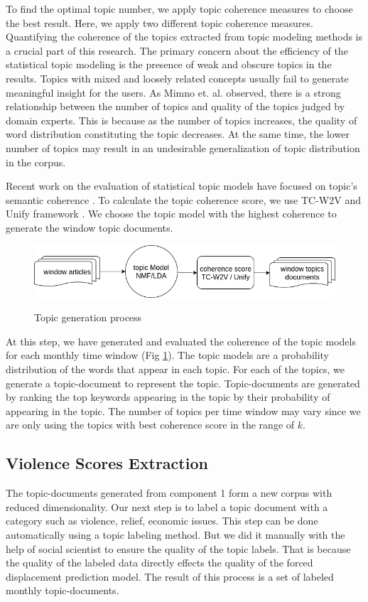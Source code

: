 To find the optimal topic number, we apply topic coherence measures to choose the best result. Here, we apply two different topic coherence measures. Quantifying the coherence of the topics extracted from topic modeling methods is a crucial part of this research. The primary concern about the efficiency of the statistical topic modeling is the presence of weak and obscure topics in the results. Topics with mixed and loosely related concepts usually fail to generate meaningful insight for the users. As Mimno et. al. \cite{Mimno} observed, there is a strong relationship between the number of topics and quality of the topics judged by domain experts. This is because as the number of topics increases, the quality of word distribution constituting the topic decreases. At the same time, the lower number of topics may result in an undesirable generalization of topic distribution in the corpus.  

Recent work on the evaluation of statistical topic models have focused on topic's semantic coherence \cite{Ocallaghan,Roder2015}. To calculate the topic coherence score, we use TC-W2V \cite{Ocallaghan} and Unify framework \cite{Roder2015}. We choose the topic model with the highest coherence to generate the window topic documents. 

\begin{figure}[!ht]
\centering
\caption{Topic generation process}
\includegraphics[scale=.4]{img/topic_generation}
\label{fig:topicgeneration}
\end{figure}

At this step, we have generated and evaluated the coherence of the topic models for each monthly time window (Fig \ref{fig:topicgeneration}). The topic models are a probability distribution of the words that appear in each topic. For each of the topics, we generate a topic-document to represent the topic. Topic-documents are generated by ranking the top keywords appearing in the topic by their probability of appearing in the topic. The number of topics per time window may vary since we are only using the topics with best coherence score in the range of $k$.

\subsection{Violence Scores Extraction}
The topic-documents generated from component 1 form a new corpus with reduced dimensionality. Our next step is to label a topic document with a category such as violence, relief, economic issues. This step can be done automatically using a topic labeling method. But we did it manually with the help of social scientist to ensure the quality of the topic labels. That is because the quality of the labeled data directly effects the quality of the forced displacement prediction model. The result of this process is a set of labeled monthly topic-documents. 

